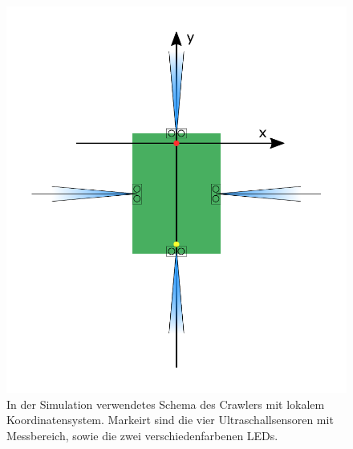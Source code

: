 \begin{figure}[ht]
	\centering
	\includegraphics[]{Images/ModelCrawler}  
	\caption{In der Simulation verwendetes Schema des Crawlers mit lokalem Koordinatensystem. Markeirt sind die vier Ultraschallsensoren mit Messbereich, sowie die zwei verschiedenfarbenen LEDs.}
	\label{fig:ModelCrawler}
\end{figure}






